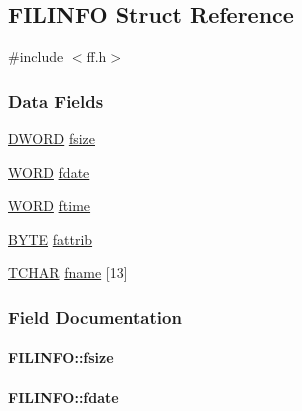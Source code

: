 \subsection{F\+I\+L\+I\+N\+F\+O Struct Reference}
\label{struct_f_i_l_i_n_f_o}


{\ttfamily \#include $<$ff.\+h$>$}

\subsubsection*{Data Fields}
\begin{DoxyCompactItemize}
\item 
\hyperlink{integer_8h_ad342ac907eb044443153a22f964bf0af}{D\+W\+O\+R\+D} \hyperlink{struct_f_i_l_i_n_f_o_aee7441af7dc0c443d1e1e6011cc7dcac}{fsize}
\item 
\hyperlink{integer_8h_a197942eefa7db30960ae396d68339b97}{W\+O\+R\+D} \hyperlink{struct_f_i_l_i_n_f_o_a7c01c48a15b1b49da459924437b0bd52}{fdate}
\item 
\hyperlink{integer_8h_a197942eefa7db30960ae396d68339b97}{W\+O\+R\+D} \hyperlink{struct_f_i_l_i_n_f_o_ae0f751b79621bf7b29669f177bbe6b9a}{ftime}
\item 
\hyperlink{integer_8h_a4ae1dab0fb4b072a66584546209e7d58}{B\+Y\+T\+E} \hyperlink{struct_f_i_l_i_n_f_o_a838d542585831b085537b363f18205c0}{fattrib}
\item 
\hyperlink{ff_8h_a03bdb8ce5895c7e261aadc2529637546}{T\+C\+H\+A\+R} \hyperlink{struct_f_i_l_i_n_f_o_abd852510f2f79b4ec773156d8942dc7c}{fname} \mbox{[}13\mbox{]}
\end{DoxyCompactItemize}


\subsubsection{Field Documentation}
\paragraph[{fsize}]{ F\+I\+L\+I\+N\+F\+O\+::fsize}\label{struct_f_i_l_i_n_f_o_aee7441af7dc0c443d1e1e6011cc7dcac}
\paragraph[{fdate}]{ F\+I\+L\+I\+N\+F\+O\+::fdate}\label{struct_f_i_l_i_n_f_o_a7c01c48a15b1b49da459924437b0bd52}
